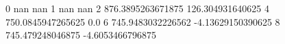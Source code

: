 0 nan nan
1 nan nan
2 876.3895263671875 126.304931640625
4 750.0845947265625 0.0
6 745.9483032226562 -4.13629150390625
8 745.479248046875 -4.6053466796875
